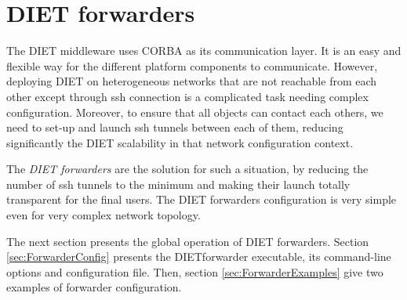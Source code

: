 \chapter{DIET forwarders}
\label{ch:forwarders}
The DIET middleware uses CORBA as its communication layer. It is an easy
and flexible way for the different platform components to communicate.
However, deploying DIET on heterogeneous networks that are not
reachable from each other except through ssh connection is a complicated
task needing complex configuration. Moreover, to ensure that all
objects can contact each others, we need to set-up and launch ssh
tunnels between each of them, reducing significantly the DIET
scalability in that network configuration context.

The \textit{DIET forwarders} are the solution for such a situation, by
reducing the number of ssh tunnels to the minimum and making their
launch totally transparent for the final users. The DIET forwarders
configuration is very simple even for very complex network topology.

The next section presents the global operation of DIET
forwarders. Section \ref{sec:ForwarderConfig} presents the DIETforwarder
executable, its command-line options and configuration file. Then,
section \ref{sec:ForwarderExamples} give two examples of forwarder
configuration.

